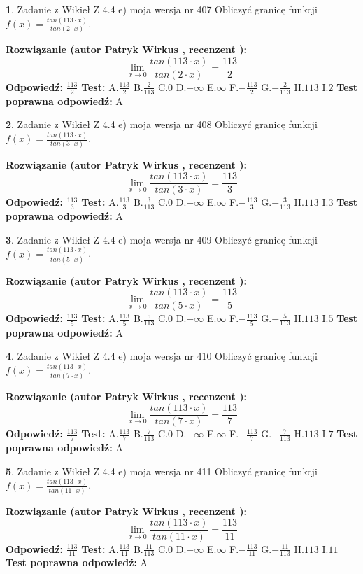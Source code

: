 \documentclass[12pt, a4paper]{article}
\theoremstyle{definition} %
\newtheorem{zad}{}
\newcommand{\zadStart}[1]{\begin{zad}#1\newline}
\newcommand{\zadStop}{\end{zad}}
\newcommand{\rozwStart}[2]{\noindent \textbf{Rozwiązanie (autor #1 , recenzent #2): }\newline}
\newcommand{\rozwStop}{\newline}
\newcommand{\odpStart}{\noindent \textbf{Odpowiedź:}\newline}
\newcommand{\odpStop}{\newline}
\newcommand{\testStart}{\noindent \textbf{Test:}\newline}
\newcommand{\testStop}{\newline}
\newcommand{\kluczStart}{\noindent \textbf{Test poprawna odpowiedź:}\newline}
\newcommand{\kluczStop}{\newline}
\begin{document}
\zadStart{Zadanie z Wikieł Z 4.4 e) moja wersja nr 407}
Obliczyć granicę funkcji $f(x)=\frac{tan(113\cdot x)}{tan(2\cdot x)}$.
\zadStop
\rozwStart{Patryk Wirkus}{}
$$\lim\limits_{x\to 0}\frac{tan(113\cdot x)}{tan(2\cdot x)}=
\frac{113}{2}$$
\rozwStop
\odpStart
$\frac{113}{2}$
\odpStop
\testStart
A.$\frac{113}{2}$
B.$\frac{2}{113}$
C.$0$
D.$-\infty$
E.$\infty$
F.$-\frac{113}{2}$
G.$-\frac{2}{113}$
H.$113$
I.$2$
\testStop
\kluczStart
A
\kluczStop



\zadStart{Zadanie z Wikieł Z 4.4 e) moja wersja nr 408}
Obliczyć granicę funkcji $f(x)=\frac{tan(113\cdot x)}{tan(3\cdot x)}$.
\zadStop
\rozwStart{Patryk Wirkus}{}
$$\lim\limits_{x\to 0}\frac{tan(113\cdot x)}{tan(3\cdot x)}=
\frac{113}{3}$$
\rozwStop
\odpStart
$\frac{113}{3}$
\odpStop
\testStart
A.$\frac{113}{3}$
B.$\frac{3}{113}$
C.$0$
D.$-\infty$
E.$\infty$
F.$-\frac{113}{3}$
G.$-\frac{3}{113}$
H.$113$
I.$3$
\testStop
\kluczStart
A
\kluczStop



\zadStart{Zadanie z Wikieł Z 4.4 e) moja wersja nr 409}
Obliczyć granicę funkcji $f(x)=\frac{tan(113\cdot x)}{tan(5\cdot x)}$.
\zadStop
\rozwStart{Patryk Wirkus}{}
$$\lim\limits_{x\to 0}\frac{tan(113\cdot x)}{tan(5\cdot x)}=
\frac{113}{5}$$
\rozwStop
\odpStart
$\frac{113}{5}$
\odpStop
\testStart
A.$\frac{113}{5}$
B.$\frac{5}{113}$
C.$0$
D.$-\infty$
E.$\infty$
F.$-\frac{113}{5}$
G.$-\frac{5}{113}$
H.$113$
I.$5$
\testStop
\kluczStart
A
\kluczStop



\zadStart{Zadanie z Wikieł Z 4.4 e) moja wersja nr 410}
Obliczyć granicę funkcji $f(x)=\frac{tan(113\cdot x)}{tan(7\cdot x)}$.
\zadStop
\rozwStart{Patryk Wirkus}{}
$$\lim\limits_{x\to 0}\frac{tan(113\cdot x)}{tan(7\cdot x)}=
\frac{113}{7}$$
\rozwStop
\odpStart
$\frac{113}{7}$
\odpStop
\testStart
A.$\frac{113}{7}$
B.$\frac{7}{113}$
C.$0$
D.$-\infty$
E.$\infty$
F.$-\frac{113}{7}$
G.$-\frac{7}{113}$
H.$113$
I.$7$
\testStop
\kluczStart
A
\kluczStop



\zadStart{Zadanie z Wikieł Z 4.4 e) moja wersja nr 411}
Obliczyć granicę funkcji $f(x)=\frac{tan(113\cdot x)}{tan(11\cdot x)}$.
\zadStop
\rozwStart{Patryk Wirkus}{}
$$\lim\limits_{x\to 0}\frac{tan(113\cdot x)}{tan(11\cdot x)}=
\frac{113}{11}$$
\rozwStop
\odpStart
$\frac{113}{11}$
\odpStop
\testStart
A.$\frac{113}{11}$
B.$\frac{11}{113}$
C.$0$
D.$-\infty$
E.$\infty$
F.$-\frac{113}{11}$
G.$-\frac{11}{113}$
H.$113$
I.$11$
\testStop
\kluczStart
A
\kluczStop
\end{document}
